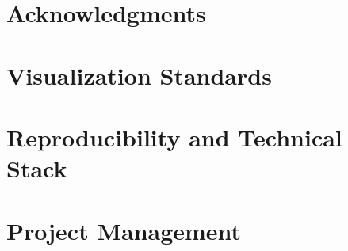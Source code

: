 \documentclass[a4paper,12pt]{article}
\begin{document}
\section*{Acknowledgments}


\appendix
\section{Visualization Standards}


\section{Reproducibility and Technical Stack}


\section{Project Management}



\end{document}
